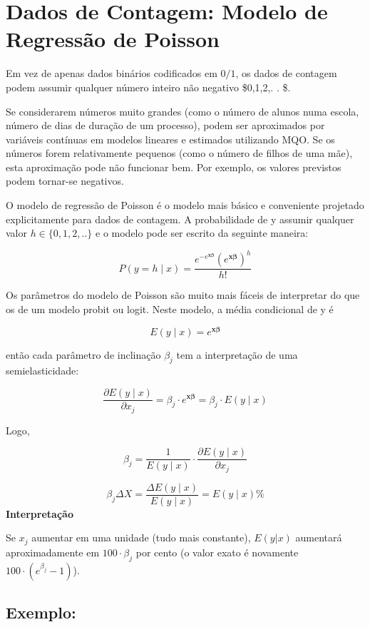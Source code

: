 \documentclass[
  letterpaper,
  DIV=11,
  numbers=noendperiod]{scrreprt}
\begin{document}
\section{Dados de Contagem: Modelo de Regressão de
Poisson}\label{dados-de-contagem-modelo-de-regressuxe3o-de-poisson}

Em vez de apenas dados binários codificados em \(0/1\), os dados de
contagem podem assumir qualquer número inteiro não negativo \$0,1,2,. .
\$.

Se considerarem números muito grandes (como o número de alunos numa
escola, número de dias de duração de um processo), podem ser aproximados
por variáveis contínuas em modelos lineares e estimados utilizando MQO.
Se os números forem relativamente pequenos (como o número de filhos de
uma mãe), esta aproximação pode não funcionar bem. Por exemplo, os
valores previstos podem tornar-se negativos.

O modelo de regressão de Poisson é o modelo mais básico e conveniente
projetado explicitamente para dados de contagem. A probabilidade de y
assumir qualquer valor \(h \in \{0,1,2,..\}\) e o modelo pode ser
escrito da seguinte maneira:

\[P(y = h \mid x) = \frac{e^{-e^{\mathbf{x} \boldsymbol{\beta}}} (e^{\mathbf{x} \boldsymbol{\beta}})^h}{h!}\]

Os parâmetros do modelo de Poisson são muito mais fáceis de interpretar
do que os de um modelo probit ou logit. Neste modelo, a média
condicional de y é

\[E(y \mid x) = e^{\mathbf{x} \boldsymbol{\beta}}\]

então cada parâmetro de inclinação \(\beta_j\) tem a interpretação de
uma semielasticidade:

\[\frac{\partial E(y \mid x)}{\partial x_j} = \beta_j \cdot e^{\mathbf{x} \boldsymbol{\beta}} = \beta_j \cdot E(y \mid x)\]

Logo,

\[\beta_j = \frac{1}{E(y \mid x)} \cdot \frac{\partial E(y \mid x)}{\partial x_j}\]

\[\beta_j \Delta{X}= \frac{\Delta E(y \mid x)}{E(y \mid x)}=E(y \mid x)\%\]
\textbf{Interpretação}

Se \(x_j\) aumentar em uma unidade (tudo mais constante), \(E(y|x)\)
aumentará aproximadamente em \(100 \cdot \beta_j\) por cento (o valor
exato é novamente \(100 \cdot (e^{\beta_j} - 1)\)).

\subsection{Exemplo:}\label{exemplo-1}
\end{document}
